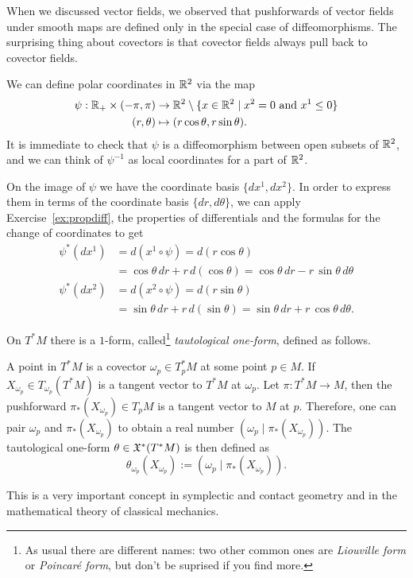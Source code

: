 When we discussed vector fields, we observed that pushforwards of vector fields under smooth maps are defined only in the special case of diffeomorphisms.
The surprising thing about covectors is that covector fields always pull back to covector fields.

\begin{example}
  We can define polar coordinates in $\mathbb{R}^2$ via the map
  \begin{align}
    \psi : \mathbb{R}_+\times (-\pi, \pi) & \to \mathbb{R}^2\setminus\{x\in\mathbb{R}^2\mid x^2=0 \mbox{ and } x^1 \leq 0\} \\
    (r, \theta)                   & \mapsto (r\cos\theta, r\sin\theta).
  \end{align}
  It is immediate to check that $\psi$ is a diffeomorphism between open subsets of $\mathbb{R}^2$, and we can think of $\psi^{-1}$ as local coordinates for a part of $\mathbb{R}^2$.

  On the image of $\psi$ we have the coordinate basis $\{dx^1, dx^2\}$. In order to express them in terms of the coordinate basis $\{dr,d\theta\}$, we can apply Exercise~\ref{ex:propdiff}, the properties of differentials and the formulas for the change of coordinates to get
  \begin{align}
    \psi^*(d x^1) & = d(x^1\circ \psi) = d(r\cos\theta)                                            \\
                  & = \cos\theta \,dr +r\,d(\cos\theta) = \cos\theta \,dr -r\,\sin\theta\,d\theta  \\
    \psi^*(d x^2) & = d(x^2\circ \psi) = d(r\sin\theta)                                            \\
                  & = \sin\theta \,dr +r\,d(\sin\theta) = \sin\theta \,dr +r\,\cos\theta\,d\theta.
  \end{align}
\end{example}

\begin{example}
  On $T^*M$ there is a $1$-form, called\footnote{As usual there are different names: two other common ones are \emph{Liouville form} or \emph{Poincar\'e form}, but don't be suprised if you find more.} \emph{tautological one-form}, defined as follows.

  A point in $T^*M$ is a covector $\omega_p\in T^*_p M$ at some point $p\in M$. If $X_{\omega_p}\in T_{\omega_p}(T^*M)$ is a tangent vector to $T^*M$ at $\omega_p$. Let $\pi:T^*M \to M$, then the pushforward $\pi_*(X_{\omega_p})\in T_p M$ is a tangent vector to $M$ at $p$.
  Therefore, one can pair $\omega_p$ and $\pi_*(X_{\omega_p})$ to obtain a real number $\left(\omega_p\;\big|\;\pi_*(X_{\omega_p})\right)$.
  The tautological one-form $\theta\in\mathfrak{X}^*(T^*M)$ is then defined as
  \begin{equation}
    \theta_{\omega_p}(X_{\omega_p}) := \left(\omega_p\;\Big|\;\pi_*(X_{\omega_p})\right).
  \end{equation}

  This is a very important concept in symplectic and contact geometry and in the mathematical theory of classical mechanics.
\end{example}

